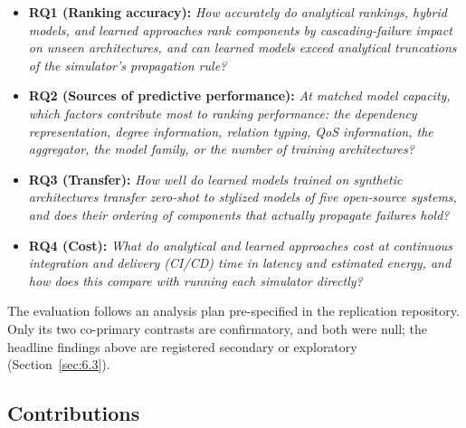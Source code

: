 \documentclass[preprint,3p]{elsarticle}
\providecommand{\tightlist}{%
  \setlength{\itemsep}{0pt}\setlength{\parskip}{0pt}}
\begin{document}
\begin{itemize}\tightlist
\item \textbf{RQ1 (Ranking accuracy):} \emph{How accurately do analytical rankings, hybrid models, and learned approaches rank components by cascading-failure impact on unseen architectures, and can learned models exceed analytical truncations of the simulator's propagation rule?}
\item \textbf{RQ2 (Sources of predictive performance):} \emph{At matched model capacity, which factors contribute most to ranking performance: the dependency representation, degree information, relation typing, QoS information, the aggregator, the model family, or the number of training architectures?}
\item \textbf{RQ3 (Transfer):} \emph{How well do learned models trained on synthetic architectures transfer zero-shot to stylized models of five open-source systems, and does their ordering of components that actually propagate failures hold?}
\item \textbf{RQ4 (Cost):} \emph{What do analytical and learned approaches cost at continuous integration and delivery (CI/CD) time in latency and estimated energy, and how does this compare with running each simulator directly?}
\end{itemize}

The evaluation follows an analysis plan pre-specified in the replication repository. Only its two co-primary contrasts are confirmatory, and both were null; the headline findings above are registered secondary or exploratory (Section~\ref{sec:6.3}).

\subsection{Contributions}
\label{sec:1.5}
\end{document}
